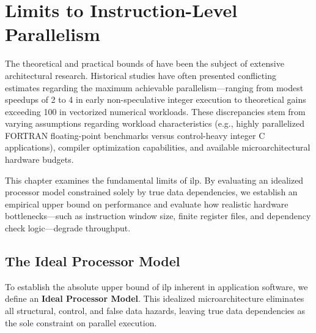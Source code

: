 \chapter{Limits to Instruction-Level Parallelism}
\label{ch:limits_to_ilp}

The theoretical and practical bounds of  have been the subject of extensive architectural research. Historical studies have often presented conflicting estimates regarding the maximum achievable parallelism—ranging from modest speedups of 2 to 4 in early non-speculative integer execution to theoretical gains exceeding 100 in vectorized numerical workloads. These discrepancies stem from varying assumptions regarding workload characteristics (e.g., highly parallelized FORTRAN floating-point benchmarks versus control-heavy integer C applications), compiler optimization capabilities, and available microarchitectural hardware budgets.

This chapter examines the fundamental limits of \gls{ilp}. By evaluating an idealized processor model constrained solely by true data dependencies, we establish an empirical upper bound on performance and evaluate how realistic hardware bottlenecks—such as instruction window size, finite register files, and dependency check logic—degrade throughput.

\section{The Ideal Processor Model}
\label{sec:ideal_processor_model}

To establish the absolute upper bound of \gls{ilp} inherent in application software, we define an \textbf{Ideal Processor Model}. This idealized microarchitecture eliminates all structural, control, and false data hazards, leaving true data dependencies as the sole constraint on parallel execution.

